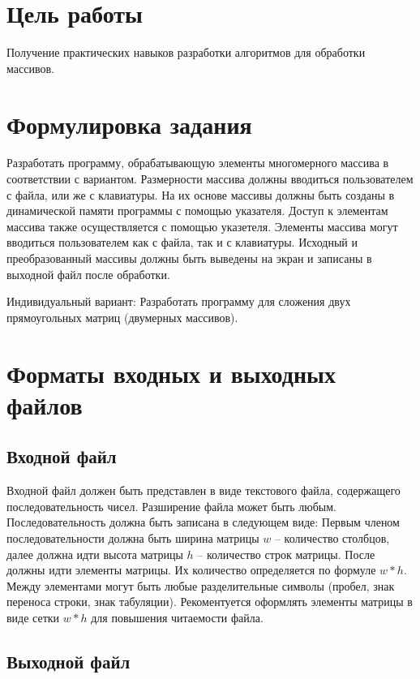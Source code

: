 \documentclass[12pt,a4paper]{article}  %
\begin{document}
	\section*{Цель работы}
	
	Получение практических навыков разработки алгоритмов для обработки
	массивов.
	
	\section*{Формулировка задания}
	
	Разработать программу, обрабатывающую элементы многомерного
	массива в соответствии с вариантом.
	Размерности массива должны вводиться пользователем с файла, или же
	с клавиатуры. На их основе массивы должны быть созданы в динамической
	памяти программы с помощью указателя. Доступ к элементам массива также
	осуществляется с помощью указетеля.
	Элементы массива могут вводиться пользователем как с файла, так и с
	клавиатуры.
	Исходный и преобразованный массивы должны быть выведены на экран
	и записаны в выходной файл после обработки.
	
	Индивидуальный вариант: Разработать программу для сложения двух 
	прямоугольных матриц (двумерных массивов).
	
	\newpage
	\section*{Форматы входных и выходных файлов}
	
	\subsection*{Входной файл}
	
	Входной файл должен быть представлен в виде текстового файла, 
	содержащего последовательность чисел. Разширение файла может быть любым.
	Последовательность должна быть записана в следующем виде:
	Первым членом последовательности должна быть ширина матрицы $ w $ -- количество
	столбцов, далее должна идти высота матрицы $ h $ -- количество
	строк матрицы. После должны идти элементы матрицы. Их количество определяется
	по формуле $ w*h $. Между элементами могут быть любые разделительные символы 
	(пробел, знак переноса строки, знак табуляции). Рекоментуется оформлять элементы
	матрицы в виде сетки $ w*h $ для повышения читаемости файла.
	
	\subsection*{Выходной файл}
	
\end{document}

